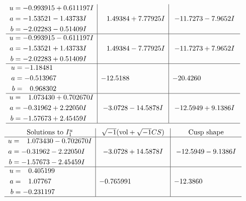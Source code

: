 \documentclass[1p]{elsarticle_modified}
\theoremstyle{definition}
\newcommand{\I}{\sqrt{-1}}
\begin{document}
$$\begin{array}{c|c|c}
\begin{aligned}
u &= -0.993915 + 0.611197 I \\
a &= -1.53521 - 1.43733 I \\
b &= -2.02283 - 0.51409 I\end{aligned}
 & \phantom{-}1.49384 + 7.77925 I & -11.7273 - 7.9652 I \\ \hline\begin{aligned}
u &= -0.993915 - 0.611197 I \\
a &= -1.53521 + 1.43733 I \\
b &= -2.02283 + 0.51409 I\end{aligned}
 & \phantom{-}1.49384 - 7.77925 I & -11.7273 + 7.9652 I \\ \hline\begin{aligned}
u &= -1.18481\phantom{ +0.000000I} \\
a &= -0.513967\phantom{ +0.000000I} \\
b &= \phantom{-}0.968302\phantom{ +0.000000I}\end{aligned}
 & -12.5188\phantom{ +0.000000I} & -20.4260\phantom{ +0.000000I} \\ \hline\begin{aligned}
u &= \phantom{-}1.073430 + 0.702670 I \\
a &= -0.31962 + 2.22050 I \\
b &= -1.57673 + 2.45459 I\end{aligned}
 & -3.0728 - 14.5878 I & -12.5949 + 9.1386 I\\
 \hline 
 \end{array}$$\newpage$$\begin{array}{c|c|c}  
\text{Solutions to }I^u_{1}& \I (\text{vol} + \sqrt{-1}CS) & \text{Cusp shape}\\
 \hline 
\begin{aligned}
u &= \phantom{-}1.073430 - 0.702670 I \\
a &= -0.31962 - 2.22050 I \\
b &= -1.57673 - 2.45459 I\end{aligned}
 & -3.0728 + 14.5878 I & -12.5949 - 9.1386 I \\ \hline\begin{aligned}
u &= \phantom{-}0.405199\phantom{ +0.000000I} \\
a &= \phantom{-}1.07767\phantom{ +0.000000I} \\
b &= -0.231197\phantom{ +0.000000I}\end{aligned}
 & -0.765991\phantom{ +0.000000I} & -12.3860\phantom{ +0.000000I}\\
 \hline 
 \end{array}$$\newpage\newpage\renewcommand{\arraystretch}{1}
\end{document}
